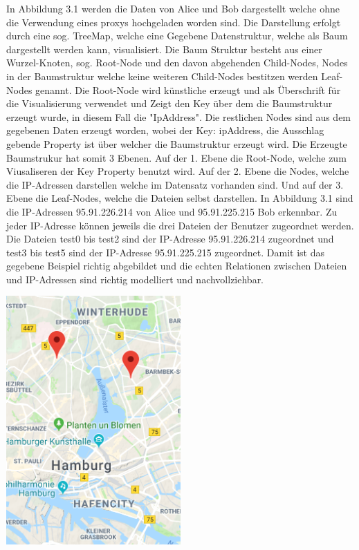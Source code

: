 \documentclass[
    fontsize=12pt,
    headings=small,
    parskip=half,           %
    bibliography=totoc,
    numbers=noenddot,       %
    open=any,               %
    ]{scrreprt}
\begin{document}
In Abbildung 3.1 werden die Daten von Alice und Bob dargestellt welche ohne die Verwendung eines proxys hochgeladen worden sind. 
Die Darstellung erfolgt durch eine sog. TreeMap, welche eine Gegebene Datenstruktur, welche als Baum dargestellt werden kann, visualisiert.
Die Baum Struktur besteht aus einer Wurzel-Knoten, sog. Root-Node und den davon abgehenden Child-Nodes, Nodes in der Baumstruktur welche keine weiteren Child-Nodes bestitzen werden Leaf-Nodes genannt. 
Die Root-Node wird künstliche erzeugt und als Überschrift für die Visualisierung verwendet und Zeigt den Key über dem die Baumstruktur erzeugt wurde, in diesem Fall die "IpAddress".
Die restlichen Nodes sind aus dem gegebenen Daten erzeugt worden, wobei der Key: ipAddress, die Ausschlag gebende Property ist über welcher die Baumstruktur erzeugt wird. 
Die Erzeugte Baumstrukur hat somit 3 Ebenen. 
Auf der 1. Ebene die Root-Node, welche zum Viusaliseren der Key Property benutzt wird. 
Auf der 2. Ebene die Nodes, welche die IP-Adressen darstellen welche im Datensatz vorhanden sind.
Und auf der 3. Ebene die Leaf-Nodes, welche die Dateien selbst darstellen.
In Abbildung 3.1 sind die IP-Adressen 95.91.226.214 von Alice und 95.91.225.215 Bob erkennbar. 
Zu jeder IP-Adresse können jeweils die drei Dateien der Benutzer zugeordnet werden. 
Die Dateien test0 bis test2 sind der IP-Adresse 95.91.226.214 zugeordnet und test3 bis test5 sind der IP-Adresse 95.91.225.215 zugeordnet.
Damit ist das gegebene Beispiel richtig abgebildet und die echten Relationen zwischen Dateien und IP-Adressen sind richtig modelliert und nachvollziehbar. 

\begin{center}
\includegraphics[width=0.5\textwidth]{../pic/IP-Proxy-SetA.png}
\end{center}
\end{document}
